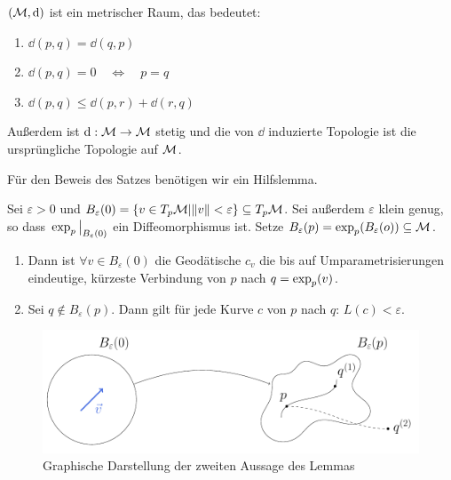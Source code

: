 \begin{satz}
\label{satz:metrischer_raum}
$(\mathcal{M}, \dd)$ ist ein metrischer Raum, das bedeutet:
\begin{enumerate}
\item  $\dd(p, q) = \dd(q, p)$
\item  $\dd(p, q) = 0  \quad \Leftrightarrow \quad p=q$
\item  $\dd(p, q) \leq \dd(p, r) + \dd(r, q)$
\end{enumerate}
Außerdem ist $\dd: \mathcal{M} \rightarrow \mathcal{M}$ stetig und die von $\dd$ induzierte Topologie ist die ursprüngliche Topologie auf $\mathcal{M}$.
\end{satz}
Für den Beweis des Satzes benötigen wir ein Hilfslemma.
\begin{lem}
Sei $\varepsilon>0$ und $B_{\varepsilon}(0) = \{ v \in T_p\mathcal{M} | \norm{v} < \varepsilon\} \subseteq T_p\mathcal{M}$. Sei außerdem $\varepsilon$ klein genug, so dass $\eval{\expp_p}_{B_{\varepsilon}(0)}$ ein Diffeomorphismus ist. Setze $B_{\varepsilon}(p) = \operatorname{exp}_p(B_{\varepsilon}(o)) \subseteq \mathcal{M}$.
\begin{enumerate}
\item Dann ist $\forall v \in B_{\varepsilon}(0)$ die Geodätische $c_v$ die bis auf Umparametrisierungen eindeutige, kürzeste Verbindung von $p$ nach $q=\operatorname{exp}_p(v)$.
\item Sei $q \notin B_{\varepsilon}(p)$. Dann gilt für jede Kurve $c$ von $p$ nach $q$: $L(c) < \varepsilon$.
\end{enumerate}
\begin{figure}[H]
	\centering
	\includegraphics[scale=0.65]{figures/tikz/lemma_geodesics}
	\caption{Graphische Darstellung der zweiten Aussage des Lemmas}
\end{figure}
\end{lem}
